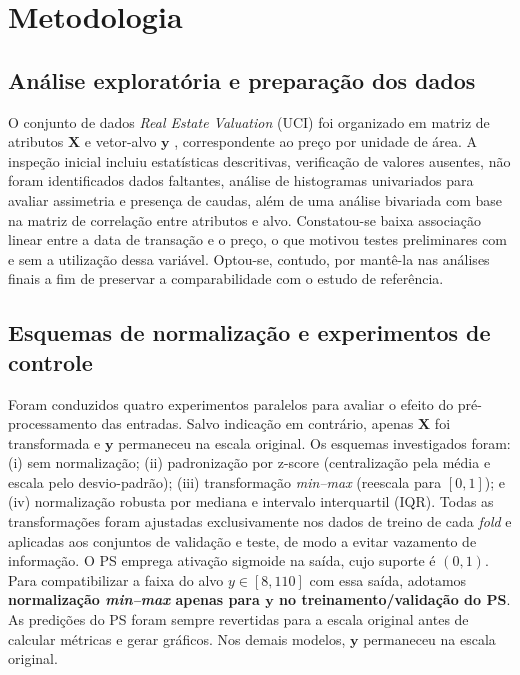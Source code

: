 \section{Metodologia}
\label{chap:metodologia}

\subsection{Análise exploratória e preparação dos dados}
O conjunto de dados \textit{Real Estate Valuation} (UCI) foi organizado em matriz de atributos $\mathbf{X}$ e vetor-alvo $\mathbf{y}$ , correspondente ao preço por unidade de área. A inspeção inicial incluiu estatísticas descritivas, verificação de valores ausentes, não foram identificados dados faltantes, análise de histogramas univariados para avaliar assimetria e presença de caudas, além de uma análise bivariada com base na matriz de correlação entre atributos e alvo. Constatou-se baixa associação linear entre a data de transação e o preço, o que motivou testes preliminares com e sem a utilização dessa variável. Optou-se, contudo, por mantê-la nas análises finais a fim de preservar a comparabilidade com o estudo de referência. 

\subsection{Esquemas de normalização e experimentos de controle}
Foram conduzidos quatro experimentos paralelos para avaliar o efeito do pré-processamento das entradas. Salvo indicação em contrário, apenas $\mathbf{X}$ foi transformada e $\mathbf{y}$ permaneceu na escala original. Os esquemas investigados foram: (i) sem normalização; (ii) padronização por z-score (centralização pela média e escala pelo desvio-padrão); (iii) transformação \textit{min--max} (reescala para $[0,1]$); e (iv) normalização robusta por mediana e intervalo interquartil (IQR). Todas as transformações foram ajustadas exclusivamente nos dados de treino de cada \textit{fold} e aplicadas aos conjuntos de validação e teste, de modo a evitar vazamento de informação. 
O PS emprega ativação sigmoide na saída, cujo suporte é $(0,1)$. Para compatibilizar a faixa do alvo $y\in [8,110]$ com essa saída, adotamos \textbf{normalização \textit{min--max} apenas para $\mathbf{y}$ no treinamento/validação do PS}. As predições do PS foram sempre revertidas para a escala original antes de calcular métricas e gerar gráficos. Nos demais modelos, $\mathbf{y}$ permaneceu na escala original.



